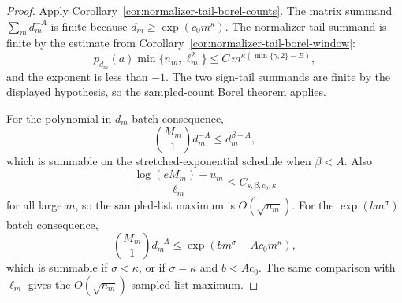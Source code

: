 \documentclass[11pt]{amsart}
\numberwithin{equation}{section}
\theoremstyle{definition}
\theoremstyle{remark}
\begin{document}
\begin{proof}
Apply Corollary~\ref{cor:normalizer-tail-borel-counts}.  The matrix summand
\(\sum_m d_m^{-A}\) is finite because \(d_m\ge\exp(c_0m^\kappa)\).  The
normalizer-tail summand is finite by the estimate from
Corollary~\ref{cor:normalizer-tail-borel-window}:
\[
  p_{d_m}(a)\min\{n_m,\ell_m^2\}
  \le C\,m^{\kappa(\min\{\gamma,2\}-B)},
\]
and the exponent is less than \(-1\).  The two sign-tail summands are finite by
the displayed hypothesis, so the sampled-count Borel theorem applies.

For the polynomial-in-\(d_m\) batch consequence,
\[
  \binom{M_m}{1}d_m^{-A}\le d_m^{\beta-A},
\]
which is summable on the stretched-exponential schedule when \(\beta<A\).  Also
\[
  \frac{\log(eM_m)+u_m}{\ell_m}\le C_{s,\beta,c_0,\kappa}
\]
for all large \(m\), so the sampled-list maximum is \(O(\sqrt{n_m})\).  For the
\(\exp(bm^\sigma)\) batch consequence,
\[
  \binom{M_m}{1}d_m^{-A}
  \le \exp\left(bm^\sigma-Ac_0m^\kappa\right),
\]
which is summable if \(\sigma<\kappa\), or if \(\sigma=\kappa\) and
\(b<Ac_0\).  The same comparison with \(\ell_m\) gives the \(O(\sqrt{n_m})\)
sampled-list maximum.
\end{proof}
\end{document}
